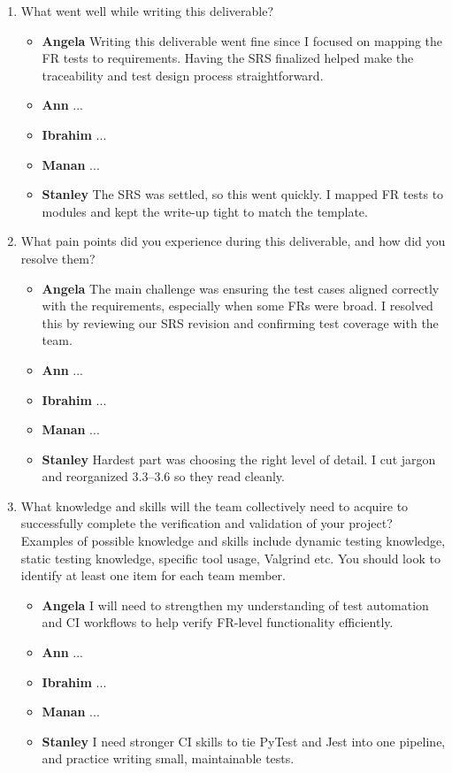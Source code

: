 \documentclass[12pt, titlepage]{article}
\begin{document}
\begin{enumerate}
  \item What went well while writing this deliverable? 
  \begin{itemize}
      \item \textbf{Angela} Writing this deliverable went fine since I focused on mapping the FR tests to requirements. Having the SRS finalized helped make the traceability and test design process straightforward.  
      \item \textbf{Ann} ...
      \item \textbf{Ibrahim} ...
      \item \textbf{Manan} ...
      \item \textbf{Stanley} The SRS was settled, so this went quickly. I mapped FR tests to modules and kept the write-up tight to match the template.
    \end{itemize}
  \item What pain points did you experience during this deliverable, and how
    did you resolve them?
  \begin{itemize}
      \item \textbf{Angela} The main challenge was ensuring the test cases aligned correctly with the requirements, especially when some FRs were broad. I resolved this by reviewing our SRS revision and confirming test coverage with the team.
      \item \textbf{Ann} ...
      \item \textbf{Ibrahim} ...
      \item \textbf{Manan} ...
      \item \textbf{Stanley} Hardest part was choosing the right level of detail. I cut jargon and reorganized 3.3–3.6 so they read cleanly.
    \end{itemize}

  \item What knowledge and skills will the team collectively need to acquire to
  successfully complete the verification and validation of your project?
  Examples of possible knowledge and skills include dynamic testing knowledge,
  static testing knowledge, specific tool usage, Valgrind etc.  You should look to
  identify at least one item for each team member.
  \begin{itemize}
      \item \textbf{Angela} I will need to strengthen my understanding of test automation and CI workflows to help verify FR-level functionality efficiently.
      \item \textbf{Ann} ...
      \item \textbf{Ibrahim} ...
      \item \textbf{Manan} ...
      \item \textbf{Stanley} I need stronger CI skills to tie PyTest and Jest into one pipeline, and practice writing small, maintainable tests.
    \end{itemize}


\end{enumerate}
\end{document}

